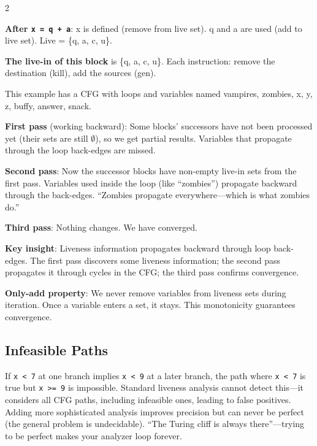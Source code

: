 \documentclass[9pt,landscape]{extarticle}
\begin{document}
\begin{multicols}{2}
\begin{exambox}
\textbf{After \texttt{x = q + a}}: x is defined (remove from live set). q and a are used (add to live set). Live = \{q, a, c, u\}.

\textbf{The live-in of this block} is \{q, a, c, u\}. Each instruction: remove the destination (kill), add the sources (gen).
\end{exambox}

\begin{exambox}
This example has a CFG with loops and variables named vampires, zombies, x, y, z, buffy, answer, snack.

\textbf{First pass} (working backward): Some blocks' successors have not been processed yet (their sets are still $\emptyset$), so we get partial results. Variables that propagate through the loop back-edges are missed.

\textbf{Second pass}: Now the successor blocks have non-empty live-in sets from the first pass. Variables used inside the loop (like ``zombies'') propagate backward through the back-edges. ``Zombies propagate everywhere---which is what zombies do.''

\textbf{Third pass}: Nothing changes. We have converged.

\textbf{Key insight}: Liveness information propagates backward through loop back-edges. The first pass discovers some liveness information; the second pass propagates it through cycles in the CFG; the third pass confirms convergence.

\textbf{Only-add property}: We never remove variables from liveness sets during iteration. Once a variable enters a set, it stays. This monotonicity guarantees convergence.
\end{exambox}

\subsection{Infeasible Paths}

If \texttt{x < 7} at one branch implies \texttt{x < 9} at a later branch, the path where \texttt{x < 7} is true but \texttt{x >= 9} is impossible. Standard liveness analysis cannot detect this---it considers all CFG paths, including infeasible ones, leading to false positives. Adding more sophisticated analysis improves precision but can never be perfect (the general problem is undecidable). ``The Turing cliff is always there''---trying to be perfect makes your analyzer loop forever.


\end{multicols}
\end{document}

